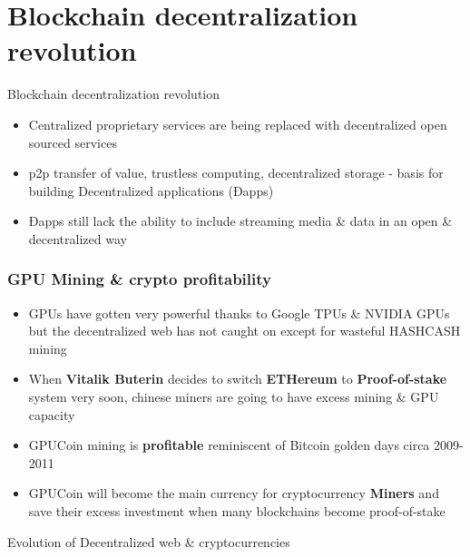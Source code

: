 \section{Blockchain decentralization revolution}
\begin{frame}[fragile]{Blockchain decentralization revolution}
 \begin{itemize}[<+-| alert@+>]%
 
\item Centralized proprietary services are being replaced with decentralized open sourced services
\item p2p transfer of value, trustless computing, decentralized storage - basis for building Decentralized applications (Ðapps)
 \item Ðapps still lack the ability to include streaming media \& data in an open \& decentralized way
\end{itemize}

\end{frame}

\begin{frame}[t]\frametitle{GPU Mining \& crypto profitability}
 
\begin{itemize}[<+-| alert@+>]
\item GPUs have gotten very powerful thanks to Google TPUs \& NVIDIA GPUs but the decentralized web has not caught on except for wasteful HASHCASH mining
\item When \textbf{Vitalik Buterin} decides to switch \textbf{ETHereum} to \textbf{Proof-of-stake} system very soon, chinese miners are going to have excess mining \& GPU capacity
\item GPUCoin mining is \textbf{profitable} reminiscent of Bitcoin golden days circa 2009-2011
\item GPUCoin will become the main currency for cryptocurrency \textbf{Miners} and save their excess investment when many blockchains become proof-of-stake
\end{itemize}

\end{frame}

\begin{frame}[t]{Evolution of Decentralized web \& cryptocurrencies}
 
\end{frame} 

